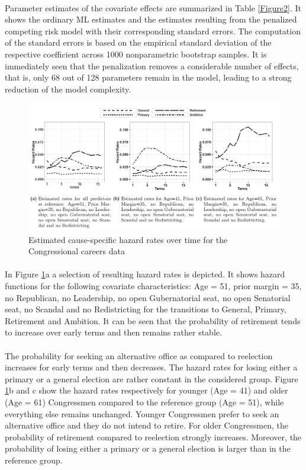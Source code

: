 \documentclass[]{article}
\begin{document}
       \paragraph{}Parameter estimates of the covariate effects are summarized in Table \ref{Figure2}. It shows the ordinary ML estimates and the estimates resulting from the penalized competing risk model with their corresponding standard errors. The computation of the standard errors is based on the empirical standard deviation of the respective coefficient across 1000 nonparametric bootstrap samples. It is immediately seen that the penalization removes a considerable number of effects, that is, only 68 out of 128 parameters remain in the model, leading to a strong reduction of the model complexity. 
       \begin{figure}
           \centering
           \includegraphics[width=\linewidth]{./Figure3.png}
           \caption{Estimated cause-specific hazard rates over time for the Congressional careers data}
            \label{Figure3}
       \end{figure} 
       \paragraph{}In Figure \ref{Figure3}a a selection of resulting hazard rates is depicted. It shows hazard functions for the following covariate characteristics: Age = 51, prior margin = 35, no Republican, no Leadership, no open Gubernatorial seat, no open Senatorial seat, no Scandal and no Redistricting for the transitions to General, Primary, Retirement and Ambition. It can be seen that the probability of retirement tends to increase over early terms and then remains rather stable.
       \paragraph{}The probability for seeking an alternative office as compared to reelection increases for early terms and then decreases. The hazard rates for losing either a primary or a general election are rather constant in the considered group. Figure \ref{Figure3}b and c show the hazard rates respectively for
       younger (Age = 41) and older (Age = 61) Congressmen compared to the reference group (Age = 51), while everything else remains unchanged. Younger Congressmen prefer to seek an alternative office and they do not intend to retire. For older Congressmen, the probability of retirement compared to reelection strongly increases. Moreover, the probability of losing either a primary or a general election is larger than in the reference group.
\end{document}
